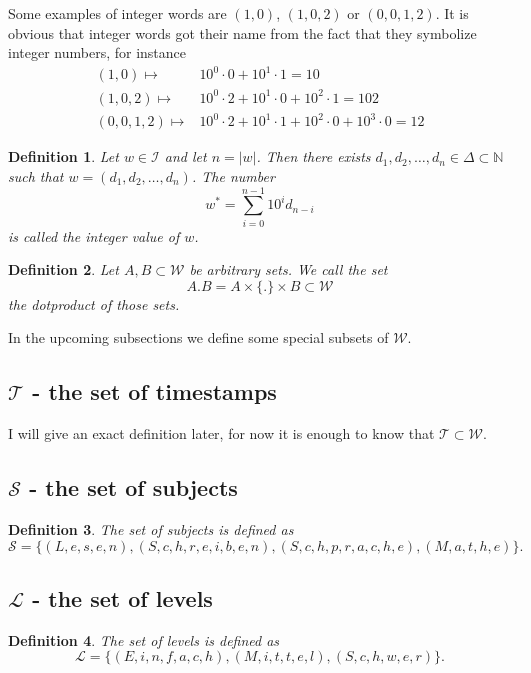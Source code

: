 \documentclass{scrartcl}
\newtheorem{mydef}{Definition}
\begin{document}
Some examples of integer words are $(1,0)$, $(1,0,2)$ or $(0,0,1,2)$. It is obvious that integer words got their name from the fact that they symbolize integer numbers, for instance
\begin{equation}
\begin{split}
(1,0)\mapsto & 10^0\cdot 0+10^1\cdot 1=10\\
(1,0,2)\mapsto & 10^0\cdot 2 + 10^1\cdot 0 + 10^2\cdot 1=102\\
(0,0,1,2)\mapsto & 10^0\cdot 2 + 10^1\cdot 1 + 10^2\cdot 0 + 10^3\cdot 0=12
\end{split}
\end{equation}

\begin{mydef}
Let $w\in\mathcal{I}$ and let $n=|w|$. Then there exists $d_1,d_2,\ldots,d_n\in\Delta\subset\mathbb{N}$ such that $w=(d_1,d_2,\ldots,d_n)$. The number $$w^{\ast}=\sum_{i=0}^{n-1}10^id_{n-i}$$ is called the \emph{integer value} of $w$.
\end{mydef}

\begin{mydef}
Let $A,B\subset\mathcal{W}$ be arbitrary sets. We call the set 
$$A.B=A\times\{.\}\times B\subset\mathcal{W}$$
the \emph{dotproduct} of those sets.
\end{mydef}

In the upcoming subsections we define some special subsets of $\mathcal{W}$.

\subsection{$\mathcal{T}$ - the set of timestamps}
I will give an exact definition later, for now it is enough to know that $\mathcal{T}\subset\mathcal{W}$.
\subsection{$\mathcal{S}$ - the set of subjects}
\begin{mydef}
The \emph{set of subjects} is defined as
\begin{equation}
\mathcal{S}=\{(L,e,s,e,n),(S,c,h,r,e,i,b,e,n),(S,c,h,p,r,a,c,h,e),(M,a,t,h,e)\}.
\end{equation}
\end{mydef}

\subsection{$\mathcal{L}$ - the set of levels}
\begin{mydef}
The \emph{set of levels} is defined as
\begin{equation}
\mathcal{L}=\{(E,i,n,f,a,c,h),(M,i,t,t,e,l),(S,c,h,w,e,r)\}.
\end{equation}
\end{mydef}
\end{document}
